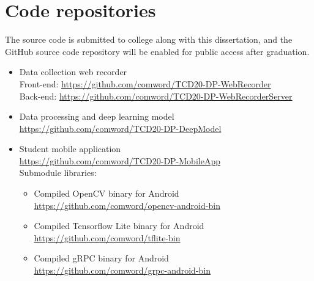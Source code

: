 \chapter{Code repositories}
The source code is submitted to college along with this dissertation, and the GitHub source code repository will be enabled for public access after graduation.
\begin{itemize}
    \item Data collection web recorder \\
    Front-end: \url{https://github.com/comword/TCD20-DP-WebRecorder} \\
    Back-end: \url{https://github.com/comword/TCD20-DP-WebRecorderServer}
    \item Data processing and deep learning model \\ 
    \url{https://github.com/comword/TCD20-DP-DeepModel}
    \item Student mobile application \\
    \url{https://github.com/comword/TCD20-DP-MobileApp} \\
    Submodule libraries:
    \begin{itemize}
        \item Compiled OpenCV binary for Android \\
        \url{https://github.com/comword/opencv-android-bin}
        \item Compiled Tensorflow Lite binary for Android \\
        \url{https://github.com/comword/tflite-bin}
        \item Compiled gRPC binary for Android \\
        \url{https://github.com/comword/grpc-android-bin}
    \end{itemize}
\end{itemize}